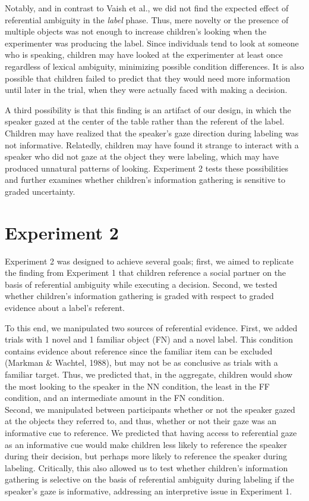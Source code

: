 \documentclass[english,man]{apa6}
\theoremstyle{definition}
\theoremstyle{definition}
\theoremstyle{definition}
\theoremstyle{remark}
\begin{document}
Notably, and in contrast to Vaish et al., we did not find the expected
effect of referential ambiguity in the \emph{label} phase. Thus, mere
novelty or the presence of multiple objects was not enough to increase
children's looking when the experimenter was producing the label. Since
individuals tend to look at someone who is speaking, children may have
looked at the experimenter at least once regardless of lexical
ambiguity, minimizing possible condition differences. It is also
possible that children failed to predict that they would need more
information until later in the trial, when they were actually faced with
making a decision.

A third possibility is that this finding is an artifact of our design,
in which the speaker gazed at the center of the table rather than the
referent of the label. Children may have realized that the speaker's
gaze direction during labeling was not informative. Relatedly, children
may have found it strange to interact with a speaker who did not gaze at
the object they were labeling, which may have produced unnatural
patterns of looking. Experiment 2 tests these possibilities and further
examines whether children's information gathering is sensitive to graded
uncertainty.

\section{Experiment 2}\label{experiment-2}

Experiment 2 was designed to achieve several goals; first, we aimed to
replicate the finding from Experiment 1 that children reference a social
partner on the basis of referential ambiguity while executing a
decision. Second, we tested whether children's information gathering is
graded with respect to graded evidence about a label's referent.

To this end, we manipulated two sources of referential evidence. First,
we added trials with 1 novel and 1 familiar object (FN) and a novel
label. This condition contains evidence about reference since the
familiar item can be excluded (Markman \& Wachtel, 1988), but may not be
as conclusive as trials with a familiar target. Thus, we predicted that,
in the aggregate, children would show the most looking to the speaker in
the NN condition, the least in the FF condition, and an intermediate
amount in the FN condition.\\
Second, we manipulated between participants whether or not the speaker
gazed at the objects they referred to, and thus, whether or not their
gaze was an informative cue to reference. We predicted that having
access to referential gaze as an informative cue would make children
less likely to reference the speaker during their decision, but perhaps
more likely to reference the speaker during labeling. Critically, this
also allowed us to test whether children's information gathering is
selective on the basis of referential ambiguity during labeling if the
speaker's gaze is informative, addressing an interpretive issue in
Experiment 1.
\end{document}
